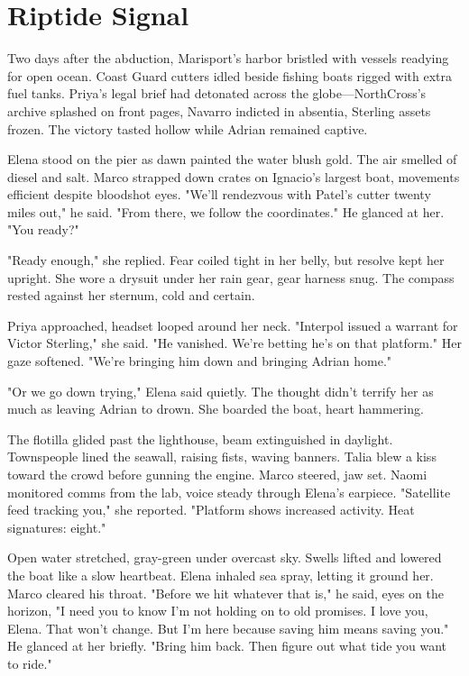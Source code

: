 \chapter{Riptide Signal}

Two days after the abduction, Marisport's harbor bristled with vessels readying for open ocean. Coast Guard cutters idled beside fishing boats rigged with extra fuel tanks. Priya's legal brief had detonated across the globe—NorthCross's archive splashed on front pages, Navarro indicted in absentia, Sterling assets frozen. The victory tasted hollow while Adrian remained captive.

Elena stood on the pier as dawn painted the water blush gold. The air smelled of diesel and salt. Marco strapped down crates on Ignacio's largest boat, movements efficient despite bloodshot eyes. "We'll rendezvous with Patel's cutter twenty miles out," he said. "From there, we follow the coordinates." He glanced at her. "You ready?"

"Ready enough," she replied. Fear coiled tight in her belly, but resolve kept her upright. She wore a drysuit under her rain gear, gear harness snug. The compass rested against her sternum, cold and certain.

Priya approached, headset looped around her neck. "Interpol issued a warrant for Victor Sterling," she said. "He vanished. We're betting he's on that platform." Her gaze softened. "We're bringing him down and bringing Adrian home."

"Or we go down trying," Elena said quietly. The thought didn't terrify her as much as leaving Adrian to drown. She boarded the boat, heart hammering.

The flotilla glided past the lighthouse, beam extinguished in daylight. Townspeople lined the seawall, raising fists, waving banners. Talia blew a kiss toward the crowd before gunning the engine. Marco steered, jaw set. Naomi monitored comms from the lab, voice steady through Elena's earpiece. "Satellite feed tracking you," she reported. "Platform shows increased activity. Heat signatures: eight."

Open water stretched, gray-green under overcast sky. Swells lifted and lowered the boat like a slow heartbeat. Elena inhaled sea spray, letting it ground her. Marco cleared his throat. "Before we hit whatever that is," he said, eyes on the horizon, "I need you to know I'm not holding on to old promises. I love you, Elena. That won't change. But I'm here because saving him means saving you." He glanced at her briefly. "Bring him back. Then figure out what tide you want to ride."

